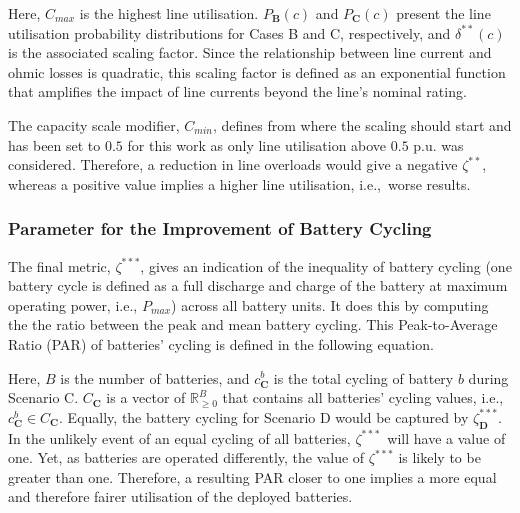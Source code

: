 

Here, $C_{max}$ is the highest line utilisation. $P_\textbf{B}(c)$ and $P_\textbf{C}(c)$ present the line utilisation probability distributions for Cases {B} and {C}, respectively, and $\delta^{**}(c)$ is the associated scaling factor. Since the relationship between line current and ohmic losses is quadratic, this scaling factor is defined as an exponential function that amplifies the impact of line currents beyond the line's nominal rating.



The capacity scale modifier, $C_{min}$, defines from where the scaling should start and has been set to $0.5$ for this work as only line utilisation above $0.5$ p.u. was considered. Therefore, a reduction in line overloads would give a negative $\zeta^{**}$, whereas a positive value implies a higher line utilisation, i.e.,~worse results.

\subsubsection{Parameter for the Improvement of Battery Cycling}
\label{ch1:subsubsec:parameter-for-the-improvement-of-battery-cycling}

The final metric, $\zeta^{***}$, gives an indication of the inequality of battery cycling (one battery cycle is defined as a full discharge and charge of the battery at maximum operating power, i.e., $P_{max}$) across all battery units. It does this by computing the the ratio between the peak and mean battery cycling. This Peak-to-Average Ratio (PAR) of batteries' cycling is defined in the following equation.



Here, $B$ is the number of batteries, and $c_\textbf{C}^b$ is the total cycling of battery $b$ during Scenario {C}. $C_\textbf{C}$ is a vector of $\mathbb{R}_{\geq 0}^{B}$ that contains all batteries' cycling values, i.e., $c_\textbf{C}^b \in C_\textbf{C}$. Equally, the battery cycling for Scenario {D} would be captured by $\zeta_\textbf{D}^{***}$. In the unlikely event of an equal cycling of all batteries, $\zeta^{***}$~will have a value of one. Yet, as batteries are operated differently, the value of $\zeta^{***}$ is likely to be greater than one. Therefore, a resulting PAR closer to one implies a more equal and therefore fairer utilisation of the deployed batteries.